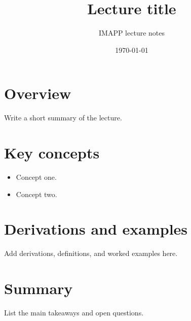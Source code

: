 \documentclass[11pt,a4paper]{article}
\title{Lecture title}
\author{IMAPP lecture notes}
\date{\today}
\begin{document}
\maketitle
\tableofcontents

\section{Overview}
Write a short summary of the lecture.

\section{Key concepts}
\begin{itemize}
  \item Concept one.
  \item Concept two.
\end{itemize}

\section{Derivations and examples}
Add derivations, definitions, and worked examples here.

\section{Summary}
List the main takeaways and open questions.
\end{document}
